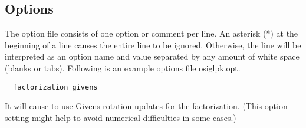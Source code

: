 \subsection{\OSIGLPK Options}
\label{sub:glpkoptions}

The \OSIGLPK option file consists of one option or comment per line.
An asterisk (*) at the beginning of a line causes the entire line to be ignored.
Otherwise, the line will be interpreted as an option name and value separated by any amount of white space (blanks or tabs).
Following is an example options file osiglpk.opt.
\begin{verbatim}
  factorization givens
\end{verbatim}
It will cause \OSIGLPK to use Givens rotation updates for the factorization. (This option setting might help to avoid numerical difficulties in some cases.)






\chapterend
